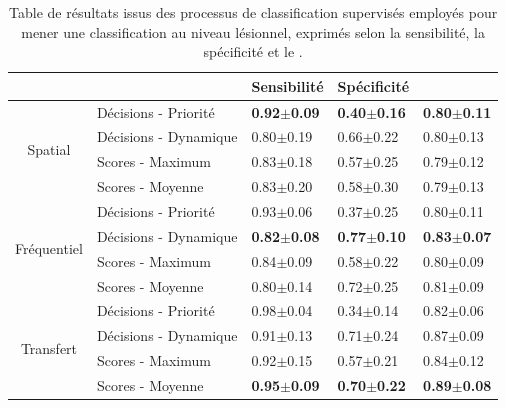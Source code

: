 \begin{table}[H]
    \centering
    \begin{tabular}{cllll}
        \toprule
        \multicolumn{1}{l}{}         &                              & Sensibilité           & Spécificité           & \fscore{}             \\ \midrule
        \multirow{4}{*}{Spatial}     & Décisions - Priorité         & \textbf{0.92$\pm$0.09}    & \textbf{0.40$\pm$0.16}    & \textbf{0.80$\pm$0.11}    \\
                                     & Décisions - Dynamique        & 0.80$\pm$0.19             & 0.66$\pm$0.22             & 0.80$\pm$0.13             \\
                                     & Scores - Maximum             & 0.83$\pm$0.18             & 0.57$\pm$0.25             & 0.79$\pm$0.12             \\
                                     & Scores - Moyenne             & 0.83$\pm$0.20             & 0.58$\pm$0.30             & 0.79$\pm$0.13             \\ \midrule
        \multirow{4}{*}{Fréquentiel} & Décisions - Priorité         & 0.93$\pm$0.06             & 0.37$\pm$0.25             & 0.80$\pm$0.11             \\
                                     & Décisions - Dynamique        & \textbf{0.82$\pm$0.08}    & \textbf{0.77$\pm$0.10}    & \textbf{0.83$\pm$0.07}    \\
                                     & Scores - Maximum             & 0.84$\pm$0.09             & 0.58$\pm$0.22             & 0.80$\pm$0.09             \\
                                     & Scores - Moyenne             & 0.80$\pm$0.14             & 0.72$\pm$0.25             & 0.81$\pm$0.09             \\ \midrule
        \multirow{4}{*}{Transfert}   & Décisions - Priorité         & 0.98$\pm$0.04             & 0.34$\pm$0.14             & 0.82$\pm$0.06             \\
                                     & Décisions - Dynamique        & 0.91$\pm$0.13             & 0.71$\pm$0.24             & 0.87$\pm$0.09             \\
                                     & Scores - Maximum             & 0.92$\pm$0.15             & 0.57$\pm$0.21             & 0.84$\pm$0.12             \\
                                     & Scores - Moyenne             & \textbf{0.95$\pm$0.09}    & \textbf{0.70$\pm$0.22}    & \textbf{0.89$\pm$0.08}    \\ \bottomrule
    \end{tabular}
    \caption{Table de résultats issus des processus de classification supervisés employés pour mener une classification au niveau lésionnel, exprimés selon la sensibilité, la spécificité et le \fscore{}.}
    \label{tab:results_lesion_classification_supervised_patient}
\end{table}

